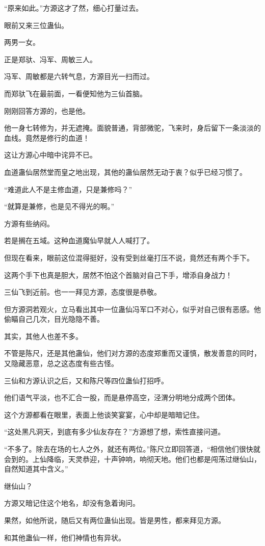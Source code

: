 \begin{this_body}
“原来如此。”方源这才了然，细心打量过去。

眼前又来三位蛊仙。

两男一女。

正是郑驮、冯军、周敏三人。

冯军、周敏都是六转气息，方源目光一扫而过。

而郑驮飞在最前面，一看便知他为三仙首脑。

刚刚回答方源的，也是他。

他一身七转修为，并无遮掩。面貌普通，背部微驼，飞来时，身后留下一条淡淡的血线。竟然是修行的血道！

这让方源心中暗中诧异不已。

血道蛊仙居然堂而皇之地出现，其他的蛊仙居然无动于衷？似乎已经习惯了。

“难道此人不是主修血道，只是兼修吗？”

“就算是兼修，也是见不得光的啊。”

方源有些纳闷。

若是搁在五域。这种血道魔仙早就人人喊打了。

但现在看来，眼前这位混得挺好，没有受到丝毫打压不说，竟然还有两个手下。

这两个手下也真是胆大，居然不怕这个首脑对自己下手，增添自身战力！

三仙飞到近前。也一一拜见方源，态度很是恭敬。

但方源洞若观火，立马看出其中一位蛊仙冯军口不对心，似乎对自己很有恶感。他偷瞄自己几次，目光隐隐不善。

其实，其他人也差不多。

不管是陈尺，还是其他蛊仙，他们对方源的态度郑重而又谨慎，散发善意的同时，又隐藏恶意，总之这态度有些古怪。

三仙和方源认识之后，又和陈尺等四位蛊仙打招呼。

他们语气平淡，也不汇合一股，而是悬停高空，泾渭分明地分成两个团体。

这个方源都看在眼里，表面上他谈笑宴宴，心中却是暗暗记住。

“这处黑凡洞天，到底有多少仙友存在？”方源想了想，索性直接问道。

“不多了。除去在场的七人之外，就还有两位。”陈尺立即回答道，“相信他们很快就会到的。上仙降临，天灵恭迎，十声钟响，响彻天地。他们也都是闯荡过继仙山，自然知道其中含义。”

继仙山？

方源又暗记住这个地名，却没有急着询问。

果然，如他所说，随后又有两位蛊仙出现。皆是男性，都来拜见方源。

和其他蛊仙一样，他们神情也有异状。


\end{this_body}

